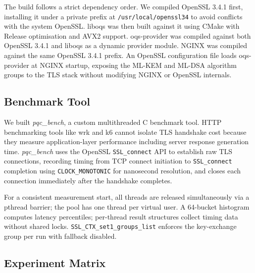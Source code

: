 \documentclass[conference]{IEEEtran}
\begin{document}
The build follows a strict dependency order. We compiled OpenSSL 3.4.1 first,
installing it under a private prefix at \texttt{/usr/local/openssl34} to avoid
conflicts with the system OpenSSL. liboqs was then built against it using CMake with
Release optimisation and AVX2 support. oqs-provider was compiled against both
OpenSSL 3.4.1 and liboqs as a dynamic provider module. NGINX was compiled against
the same OpenSSL 3.4.1 prefix. An OpenSSL configuration file loads oqs-provider at
NGINX startup, exposing the ML-KEM and ML-DSA algorithm groups to the TLS stack
without modifying NGINX or OpenSSL internals.

\subsection{Benchmark Tool}

We built \textit{pqc\_bench}, a custom multithreaded C benchmark tool. HTTP benchmarking tools like wrk and k6 cannot isolate TLS handshake cost because they measure application-layer performance including server response generation time. \textit{pqc\_bench} uses the OpenSSL \texttt{SSL\_connect} API to establish raw TLS connections, recording timing from TCP connect initiation to \texttt{SSL\_connect} completion using \texttt{CLOCK\_MONOTONIC} for nanosecond resolution, and closes each connection immediately after the handshake completes.

For a consistent measurement start, all threads are released simultaneously via a
pthread barrier; the pool has one thread per virtual user. A 64-bucket histogram
computes latency percentiles; per-thread result structures collect timing data
without shared locks. \texttt{SSL\_CTX\_set1\_groups\_list} enforces the
key-exchange group per run with fallback disabled.

\subsection{Experiment Matrix}
\end{document}
